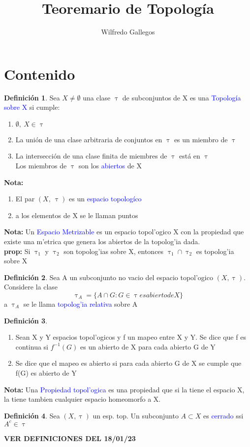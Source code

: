 \documentclass{article}
\title{Teoremario de Topología}
\author{Wilfredo Gallegos}
\theoremstyle{definition}
\newtheorem{definition}{Definición}[section]
\begin{document}
\maketitle

\section{Contenido}
\begin{definition}
 	Sea $X\neq \emptyset$ una clase $\uptau$ de	subconjuntos de X es una \textcolor{blue}{Topología sobre X} si cumple:
 	\begin{enumerate}
 	\item $\emptyset,\ X\in \uptau$
 	\item  La unión de una clase arbitraria de conjuntos en $\uptau$ es un miembro de $\uptau$
 	\item La intersección de una clase finita de miembres de $\uptau$ está en $\uptau$\\
 	Los miembros de $\uptau$ son los \textcolor{blue}{abiertos} de X 
	\end{enumerate}
\end{definition}
\textbf{Nota: } 
\begin{enumerate}
	\item El par $(X,\ \uptau)$ es un \textcolor{blue}{espacio topologíco} 
	\item a los elementos de X se le llaman puntos
\end{enumerate}
\textbf{Nota: }
Un \textcolor{blue}{Espacio Metrizable} es un espacio topol'ogico X con la propiedad que existe una m'etrica que genera los abiertos de la topolog'ia dada.\\

\textbf{prop: }
Si $\uptau_1$ y $\uptau_2$ son topolog'ias sobre X, entonces $\uptau_1\cap\uptau_2$ es topolog'ia sobre X
\begin{definition}
	Sea A un subconjunto no vacio del espacio topol'ogico $(X, \uptau)$. Considere la clase 
	\[\uptau_A=\{A\cap G: G\in\uptau es abierto de X\}\]
	a $\uptau_A$ se le llama \textcolor{blue}{topolog'ia relativa} sobre A
\end{definition}
\begin{definition}
	\begin{enumerate}
		\item Sean X y Y espacios topol'ogicos y f un mapeo entre X y Y. Se dice que f es continua si $f^{-1}(G)$ es un abierto de X para cada abierto G de Y
		\item Se dice que el mapeo es abierto si para cada abierto G de X se cumple que f(G) es abierto de Y
	\end{enumerate}
\end{definition}
\textbf{Nota: } 
Una \textcolor{blue}{Propiedad topol'ogica} es una propiedad que si la tiene el espacio X, la tiene tambien cualquier espacio homeomorfo a X.
\begin{definition}
	Sea $(X,\uptau)$ un esp. top. Un subconjunto $A\subset X$ es \textcolor{blue}{cerrado} ssi $A^c\in\uptau$
\end{definition}
\textbf{VER DEFINICIONES DEL 18/01/23}\\
\end{document}
